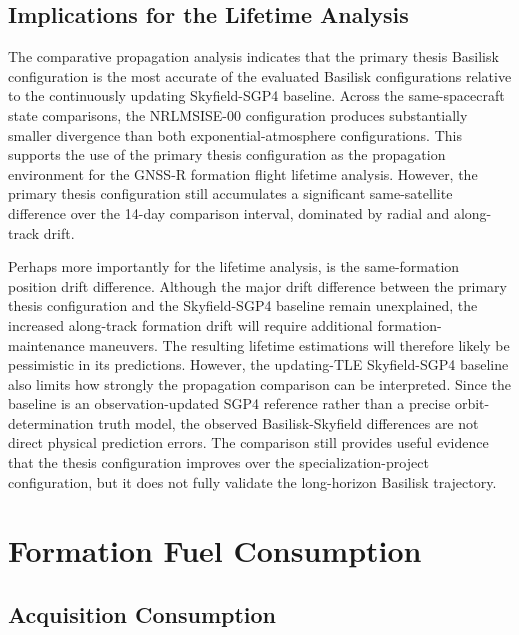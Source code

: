 \subsection{Implications for the Lifetime Analysis}
\label{sec:comparison_implication_for_lifetime}

The comparative propagation analysis indicates that the primary thesis Basilisk configuration is the most accurate of the evaluated Basilisk configurations relative to the continuously updating Skyfield-SGP4 baseline. Across the same-spacecraft state comparisons, the NRLMSISE-00 configuration produces substantially smaller divergence than both exponential-atmosphere configurations. This supports the use of the primary thesis configuration as the propagation environment for the GNSS-R formation flight lifetime analysis. However, the primary thesis configuration still accumulates a significant same-satellite difference over the 14-day comparison interval, dominated by radial and along-track drift. 

Perhaps more importantly for the lifetime analysis, is the same-formation position drift difference. Although the major drift difference between the primary thesis configuration and the Skyfield-SGP4 baseline remain unexplained, the increased along-track formation drift will require additional formation-maintenance maneuvers. The resulting lifetime estimations will therefore likely be pessimistic in its predictions. However, the updating-TLE Skyfield-SGP4 baseline also limits how strongly the propagation comparison can be interpreted. Since the baseline is an observation-updated SGP4 reference rather than a precise orbit-determination truth model, the observed Basilisk-Skyfield differences are not direct physical prediction errors. The comparison still provides useful evidence that the thesis configuration improves over the specialization-project configuration, but it does not fully validate the long-horizon Basilisk trajectory.









\section{Formation Fuel Consumption}

\subsection{Acquisition Consumption}
\label{sec:discussion_acq_consumption}

